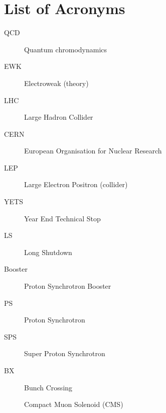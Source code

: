 \chapter{List of Acronyms}
\label{chap:IV-1-acronyms}

  \begin{description}

    \item[QCD]		    \dotfill	Quantum chromodynamics
    \item[EWK]		    \dotfill	Electroweak (theory)

    \item[LHC]		    \dotfill	Large Hadron Collider
    \item[CERN]       \dotfill	European Organisation for Nuclear Research
    \item[LEP]        \dotfill  Large Electron Positron (collider)
    \item[YETS]       \dotfill  Year End Technical Stop
    \item[LS]         \dotfill  Long Shutdown
    \item[Booster]    \dotfill  Proton Synchrotron Booster
    \item[PS]         \dotfill  Proton Synchrotron
    \item[SPS]        \dotfill  Super Proton Synchrotron
    \item[BX]         \dotfill  Bunch Crossing

    Compact Muon Solenoid (CMS)

  \end{description}

